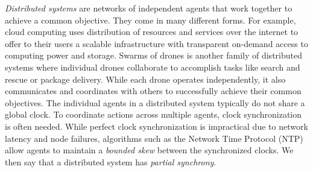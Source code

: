 \documentclass[iicol,lineno]{sn-jnl}
\newcommand{\?}{\text{?}}
\begin{document}
	\emph{Distributed systems} are networks of independent agents that work together to achieve a 
	common objective.
	They come in many different forms.
	For example, cloud computing uses distribution of resources and services over the internet to offer 
	to their users a scalable infrastructure with transparent on-demand access to computing power and 
	storage. 
	Swarms of drones is another family of distributed systems where individual drones 
	collaborate to accomplish tasks like search and rescue or package delivery.
	While each drone operates independently, it also communicates and coordinates with others to 
	successfully achieve their common objectives.
	The individual agents in a distributed system typically do not share a global clock.
	To coordinate actions across multiple agents, clock synchronization is often needed.
	While perfect clock synchronization is impractical due to network latency and node failures, 
	algorithms such as the Network Time Protocol (NTP) allow agents to maintain a \emph{bounded 
		skew} between the synchronized clocks.
	We then say that a distributed system has \emph{partial synchrony}. 
	
\end{document}
